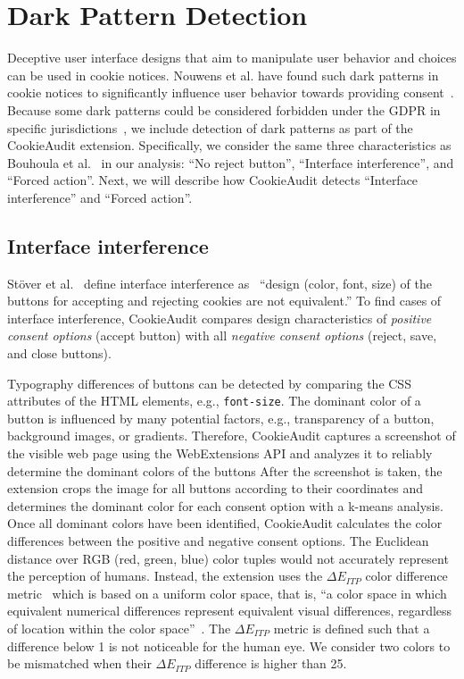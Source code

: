 \section{Dark Pattern Detection}
Deceptive user interface designs that aim to manipulate user behavior and choices can be used in cookie notices.
Nouwens et al. have found such dark patterns in cookie notices to significantly influence user behavior towards providing consent~\cite{nouwens2020dark}.
Because some dark patterns could be considered forbidden under the GDPR in specific jurisdictions~\cite{gray2021dark}, we include detection of dark patterns as part of the CookieAudit extension.
Specifically, we consider the same three characteristics as Bouhoula et al.~\cite{bouhoula2023automated} in our analysis: \enquote{No reject button}, \enquote{Interface interference}, and \enquote{Forced action}.
Next, we will describe how CookieAudit detects \enquote{Interface interference} and \enquote{Forced action}.

\subsection{Interface interference}
Stöver et al.~\cite{stover2022website} define interface interference as ~\enquote{design (color, font, size) of the buttons for accepting and rejecting cookies are not equivalent.}
To find cases of interface interference, CookieAudit compares design characteristics of \emph{positive consent options} (accept button) with all \emph{negative consent options} (reject, save, and close buttons).

Typography differences of buttons can be detected by comparing the CSS attributes of the HTML elements, e.g., \texttt{font-size}.
The dominant color of a button is influenced by many potential factors, e.g., transparency of a button, background images, or gradients.
Therefore, CookieAudit captures a screenshot of the visible web page using the WebExtensions API and analyzes it to reliably determine the dominant colors of the buttons
After the screenshot is taken, the extension crops the image for all buttons according to their coordinates and determines the dominant color for each consent option with a k-means analysis.
Once all dominant colors have been identified, CookieAudit calculates the color differences between the positive and negative consent options.
The Euclidean distance over RGB (red, green, blue) color tuples would not accurately represent the perception of humans. 
Instead, the extension uses the $\Delta E_{ITP}$ color difference metric~\cite{ITURBT2124} which is based on a uniform color space, that is, \enquote{a color space in which equivalent numerical differences represent equivalent visual differences, regardless of location within the color space}~\cite{x_rite2024color}.
The $\Delta E_{ITP}$ metric is defined such that a difference below 1 is not noticeable for the human eye. We consider two colors to be mismatched when their $\Delta E_{ITP}$ difference is higher than 25.

